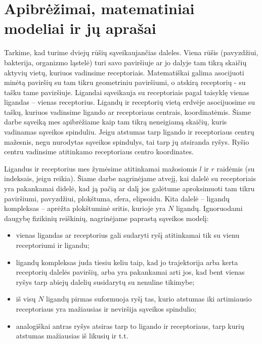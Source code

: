 \documentclass[10pt]{article}
\begin{document}
\section{Apibrėžimai, matematiniai modeliai ir jų aprašai}

Tarkime, kad turime dviejų rūšių sąveikaujančias daleles. Viena rūšis (pavyzdžiui, bakterija, organizmo ląstelė) turi savo paviršiuje ar jo dalyje tam tikrą skaičių aktyvių vietų, kuriuos  vadinsime receptoriais. Matematiškai galima asocijuoti minėtą paviršių su tam tikru geometriniu paviršiumi, o atskirą receptorių -  su tašku tame paviršiuje. Ligandai  sąveikauja su receptoriais pagal taisyklę vienas ligandas – vienas receptorius.  Ligandų ir receptorių vietą erdvėje asocijuosime su taškų, kuriuos vadinsime ligando ar receptoriaus centrais, koordinatėmis. Šiame darbe sąveiką mes apibrėžiame kaip tam tikrą neneigiamą skaičių, kuris vadinamas sąveikos spinduliu. Jeigu atstumas tarp ligando ir receptoriaus centrų mažesnis, negu nurodytas sąveikos spindulys, tai tarp jų atsiranda ryšys. Ryšio centru vadinsime atitinkamo receptoriaus centro koordinates.

Ligandus ir receptorius mes žymėsime atitinkamai  mažosiomis  $l$ ir $r$ raidėmis (su indeksais, jeigu reikia). Šiame darbe  nagrinėjame atvejį, kai dalelė su receptoriais yra pakankamai didelė, kad  ją pačią  ar  dalį jos  galėtume aproksimuoti tam tikru paviršiumi, pavyzdžiui,  plokštuma, sfera, elipsoidu.  Kita dalelė – ligandų kompleksas –  aprėžta plokštuminė sritis, kurioje yra $ N $  ligandų. Ignoruodami daugybę fizikinių  reiškinių, nagrinėjame paprastą  sąveikos  modelį: 
\begin{itemize}

\item vienas ligandas ar receptorius gali sudaryti ryšį atitinkamai tik su vienu receptoriumi ir ligandu;

\item   ligandų kompleksas juda tiesiu keliu taip, kad jo trajektorija arba kerta receptorių dalelės paviršių, arba yra pakankamai arti jos, kad bent vienas ryšys tarp abiejų dalelių susidarytų  su nenuline tikimybe;

\item iš visų $N$ ligandų pirmas suformuoja ryšį tas, kurio atstumas iki artimiausio receptoriaus yra  mažiausias ir neviršija sąveikos spindulio;

\item  analogiškai antras ryšys atsiras tarp to ligando ir receptoriaus, tarp kurių atstumas mažiausias iš likusių ir t.t.  
\end{itemize}
               
\end{document}
